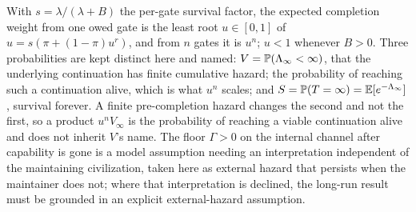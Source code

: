 \begin{proposition}\label{imp:fixedpoint}
With $s=\lambda/(\lambda+B)$ the per-gate survival factor, the
expected completion weight from one owed gate is the least root
$u\in[0,1]$ of $u=s(\pi+(1-\pi)u^{r})$, and from $n$ gates it is $u^{n}$; $u<1$ whenever $B>0$. Three probabilities are kept distinct here and named: $V = \mathbb{P}(\Lambda_\infty < \infty)$, that the underlying continuation has finite cumulative hazard; the probability of reaching such a continuation alive, which is what $u^{n}$ scales; and $S = \mathbb{P}(T = \infty) = \mathbb{E}[e^{-\Lambda_\infty}]$, survival forever. A finite pre-completion hazard changes the second and not the first, so a product $u^{n}V_\infty$ is the probability of reaching a viable continuation alive and does not inherit $V$'s name. The floor $\Gamma > 0$ on the internal channel after capability is gone is a model assumption needing an interpretation independent of the maintaining civilization, taken here as external hazard that persists when the maintainer does not; where that interpretation is declined, the long-run result must be grounded in an explicit external-hazard assumption.
\end{proposition}

